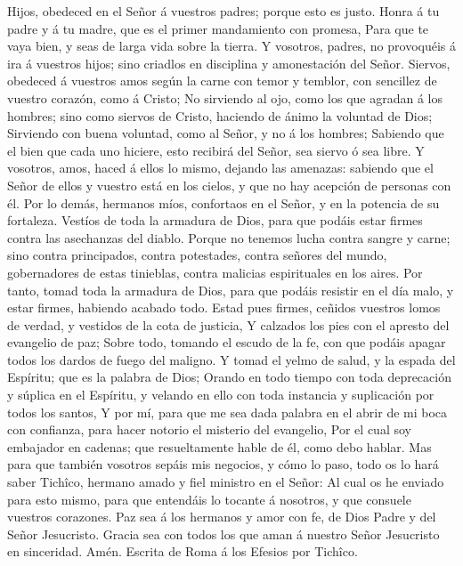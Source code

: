  Hijos, obedeced en el Señor á vuestros padres; porque esto
es justo.  Honra á tu padre y á tu madre, que es el primer
mandamiento con promesa,  Para que te vaya bien, y seas de
larga vida sobre la tierra.  Y vosotros, padres, no
provoquéis á ira á vuestros hijos; sino criadlos en disciplina y
amonestación del Señor.  Siervos, obedeced á vuestros amos
según la carne con temor y temblor, con sencillez de vuestro corazón,
como á Cristo;  No sirviendo al ojo, como los que agradan á
los hombres; sino como siervos de Cristo, haciendo de ánimo la voluntad
de Dios;  Sirviendo con buena voluntad, como al Señor, y no
á los hombres;  Sabiendo que el bien que cada uno hiciere,
esto recibirá del Señor, sea siervo ó sea libre.  Y
vosotros, amos, haced á ellos lo mismo, dejando las amenazas: sabiendo
que el Señor de ellos y vuestro está en los cielos, y que no hay
acepción de personas con él.  Por lo demás, hermanos míos,
confortaos en el Señor, y en la potencia de su fortaleza. 
Vestíos de toda la armadura de Dios, para que podáis estar firmes contra
las asechanzas del diablo.  Porque no tenemos lucha contra
sangre y carne; sino contra principados, contra potestades, contra
señores del mundo, gobernadores de estas tinieblas, contra malicias
espirituales en los aires.  Por tanto, tomad toda la
armadura de Dios, para que podáis resistir en el día malo, y estar
firmes, habiendo acabado todo.  Estad pues firmes, ceñidos
vuestros lomos de verdad, y vestidos de la cota de justicia,
 Y calzados los pies con el apresto del evangelio de paz;
 Sobre todo, tomando el escudo de la fe, con que podáis
apagar todos los dardos de fuego del maligno.  Y tomad el
yelmo de salud, y la espada del Espíritu; que es la palabra de Dios;
 Orando en todo tiempo con toda deprecación y súplica en el
Espíritu, y velando en ello con toda instancia y suplicación por todos
los santos,  Y por mí, para que me sea dada palabra en el
abrir de mi boca con confianza, para hacer notorio el misterio del
evangelio,  Por el cual soy embajador en cadenas; que
resueltamente hable de él, como debo hablar.  Mas para que
también vosotros sepáis mis negocios, y cómo lo paso, todo os lo hará
saber Tichîco, hermano amado y fiel ministro en el Señor: 
Al cual os he enviado para esto mismo, para que entendáis lo tocante á
nosotros, y que consuele vuestros corazones.  Paz sea á los
hermanos y amor con fe, de Dios Padre y del Señor Jesucristo.
 Gracia sea con todos los que aman á nuestro Señor
Jesucristo en sinceridad. Amén. Escrita de Roma á los Efesios por
Tichîco.
